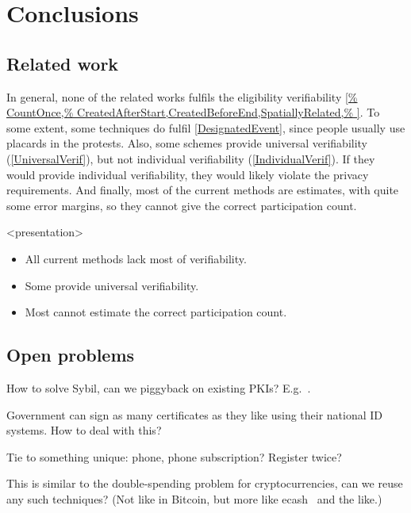 \mode*
\section{Conclusions}

\subsection<presentation>{Related work}

In general, none of the related works fulfils the eligibility verifiability 
\cref{%
  CountOnce,%
  CreatedAfterStart,CreatedBeforeEnd,SpatiallyRelated,%
}.
To some extent, some techniques do fulfil \cref{DesignatedEvent}, since people 
usually use placards in the protests.
Also, some schemes provide universal verifiability (\cref{UniversalVerif}), but 
not individual verifiability (\cref{IndividualVerif}).
If they would provide individual verifiability, they would likely violate the 
privacy requirements.
And finally, most of the current methods are estimates, with quite some error 
margins, so they cannot give the correct participation count.

\begin{frame}<presentation>
  \begin{remark}
    \begin{itemize}
      \item All current methods lack most of verifiability.
      \item Some provide universal verifiability.

        \pause

      \item Most cannot estimate the correct participation count.
    \end{itemize}
  \end{remark}
\end{frame}

\subsection{Open problems}

\begin{frame}
  \begin{question}
    How to solve Sybil, can we piggyback on existing \acp{PKI}?
    E.g.~\cite{Cinderella}.
  \end{question}

  \begin{question}
    Government can sign as many certificates as they like using their national 
    ID systems.
    How to deal with this?
  \end{question}

  \begin{question}
    Tie to something unique: phone, phone subscription?
    Register twice?
  \end{question}

  \begin{question}
    This is similar to the double-spending problem for cryptocurrencies, can 
    we reuse any such techniques?
    (Not like in Bitcoin, but more like ecash~\cite{ecash} and the like.)
  \end{question}
\end{frame}


